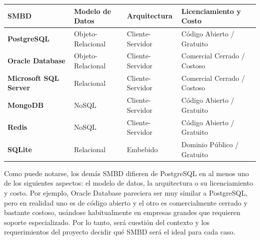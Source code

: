 \begin{table}[h!]
\centering
\renewcommand{\arraystretch}{1.3}
\begin{tabular}{l l l l}
\hline \hline
\textbf{SMBD} & \textbf{Modelo de Datos} & \textbf{Arquitectura} & \textbf{Licenciamiento y Costo} \\ 
\hline
\textbf{PostgreSQL} & Objeto-Relacional & Cliente-Servidor & Código Abierto / Gratuito \\ 
\textbf{Oracle Database} & Objeto-Relacional & Cliente-Servidor & Comercial Cerrado / Costoso \\ 
\textbf{Microsoft SQL Server} & Relacional & Cliente-Servidor & Comercial Cerrado / Costoso \\ 
\textbf{MongoDB} & NoSQL & Cliente-Servidor & Código Abierto / Gratuito \\ 
\textbf{Redis} & NoSQL & Cliente-Servidor & Código Abierto / Gratuito \\ 
\textbf{SQLite} & Relacional & Embebido & Dominio Público / Gratuito \\ 
\hline \hline
\end{tabular}
\end{table}

Como puede notarse, los demás SMBD difieren de PostgreSQL en al menos uno de los siguientes aspectos: el modelo de datos, la arquitectura o su licenciamiento y costo. Por ejemplo, Oracle Database pareciera ser muy similar a PostgreSQL, pero en realidad uno es de código abierto y el otro es comercialmente cerrado y bastante costoso, usándose habitualmente en empresas grandes que requieren soporte especializado. Por lo tanto, será cuestión del contexto y los requerimientos del proyecto decidir qué SMBD será el ideal para cada caso.
\newpage
